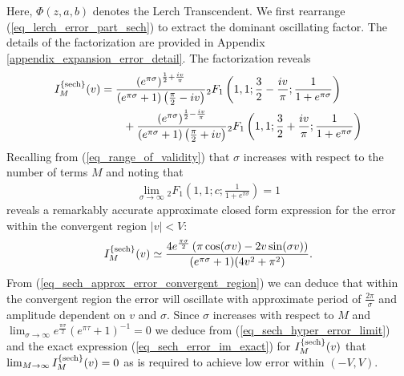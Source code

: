 Here, $\Phi(z,a,b)$ denotes the Lerch Transcendent.
We first rearrange (\ref{eq_lerch_error_part_sech}) to extract the
dominant oscillating factor.  The details of the factorization are
provided in Appendix \ref{appendix_expansion_error_detail}.
The factorization reveals
\begin{align}
\begin{split}
	I_M^{\{\operatorname{sech}\}}(v) &= 
    \frac{\left( e^{\pi\sigma} \right)^{\frac{1}{2} + \frac{iv}{\pi}}}
         {\left( e^{\pi\sigma} + 1 \right)\left( \frac{\pi}{2} - iv \right)}
    {}_{2}F_{1}\left(1,1; \frac{3}{2} - \frac{iv}{\pi}; \frac{1}{1 + e^{\pi\sigma}} \right) \\
    &\quad\quad +
    \frac{\left( e^{\pi\sigma} \right)^{\frac{1}{2} - \frac{iv}{\pi}}}
    {\left( e^{\pi\sigma} + 1 \right)\left( \frac{\pi}{2} + iv \right)}
    {}_{2}F_{1}\left(1,1; \frac{3}{2} + \frac{iv}{\pi}; \frac{1}{1 + e^{\pi\sigma}} \right)
    \label{eq_sech_error_im_exact}
\end{split}
\end{align}
Recalling from (\ref{eq_range_of_validity}) that $\sigma$ increases
with respect to the number of terms $M$ and noting that
\begin{align}
	\lim_{\sigma \to \infty} {}_{2}F_{1}\left(1, 1; c; \frac{1}{1+e^{\pi \sigma}}\right) = 1
	\label{eq_sech_hyper_error_limit}
\end{align}
reveals a remarkably accurate approximate closed form expression for the error within
the convergent region $|v| < V$:
\begin{align}
	I_M^{\{\operatorname{sech}\}}(v) \simeq
	\frac{
		4 e^{\frac{\pi \sigma}{2}}
		\left(\pi \cos(\sigma v) - 2 v \sin(\sigma v)\right)
	}{(e^{\pi \sigma} + 1)(4v^2 + \pi^2)}.
	\label{eq_sech_approx_error_convergent_region}
\end{align}
From (\ref{eq_sech_approx_error_convergent_region}) we can deduce
that within the convergent region the error will oscillate
with approximate period of $\frac{2 \pi}{\sigma}$ and amplitude
dependent on $v$ and $\sigma$.  Since $\sigma$ increases with respect to $M$ and
$\lim_{\sigma \to \infty} e^{\frac{\pi \sigma}{2}}(e^{\pi \tau} + 1)^{-1} = 0$
we deduce from (\ref{eq_sech_hyper_error_limit}) and the exact
expression (\ref{eq_sech_error_im_exact}) for $I_M^{\{\operatorname{sech}\}}(v)$ that
$\lim_{M \to \infty} I_M^{\{\operatorname{sech}\}}(v) = 0$ as is
required to achieve low error within $(-V, V)$.

